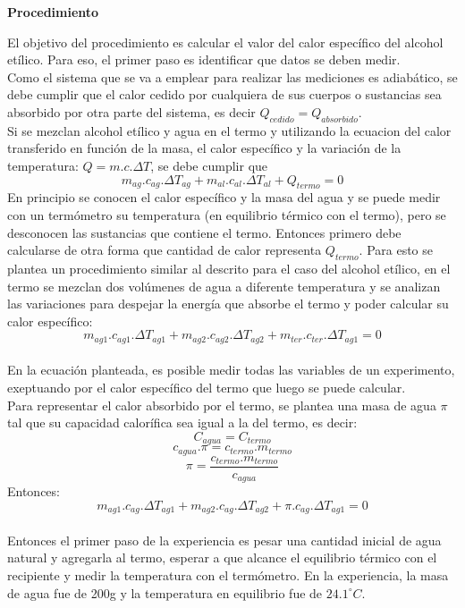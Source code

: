 \documentclass[11pt, letterpaper]{article}
\newcommand\celc{^\circ C}
\begin{document}
\pagebreak
\begin{center}\textbf{Procedimiento}\end{center}
El objetivo del procedimiento es calcular el valor del calor 
específico del alcohol etílico. Para eso, el primer paso es
identificar que datos se deben medir.\\
Como el sistema que se va a emplear para realizar las mediciones
es adiabático, se debe cumplir que el calor cedido por cualquiera
de sus cuerpos o sustancias sea absorbido por otra parte del 
sistema, es decir $Q_{cedido} = Q_{absorbido}$.\\
Si se mezclan alcohol etílico y agua en el termo y 
utilizando la ecuacion del calor transferido en función de la 
masa, el calor específico y la variación de la temperatura:
$Q = m.c.\Delta T$, se debe cumplir que 
$$m_{ag}.c_{ag}.\Delta T_{ag} + m_{al}.c_{al}.\Delta T_{al} + Q_{termo} = 0$$
En principio se conocen el calor específico y la masa del agua
y se puede medir con un termómetro su temperatura (en equilibrio
térmico con el termo), pero se desconocen las sustancias que 
contiene el termo. Entonces primero debe calcularse de otra
forma que cantidad de calor representa $Q_{termo}$.
Para esto se plantea un procedimiento similar al descrito para
el caso del alcohol etílico, en el termo se mezclan dos volúmenes
de agua a diferente temperatura y se analizan las variaciones
para despejar la energía que absorbe el termo y poder calcular
su calor específico:\\
$$m_{ag1}.c_{ag1}.\Delta T_{ag1} + m_{ag2}.c_{ag2}.\Delta T_{ag2} + m_{ter} 
.c_{ter}.\Delta T_{ag1} = 0$$\\
En la ecuación planteada, es posible medir todas las variables 
de un experimento, exeptuando por el calor específico del termo
que luego se puede calcular.\\
Para representar el calor absorbido por el termo, se plantea una masa de 
agua $\pi$ tal que su capacidad calorífica sea igual a la del termo, es decir:
$$ C_{agua} = C_{termo}$$
$$c_{agua}.\pi = c_{termo}.m_{termo}$$
$$\pi = \frac{c_{termo}.m_{termo}}{c_{agua}}$$
Entonces:
$$m_{ag1}.c_{ag}.\Delta T_{ag1} + m_{ag2}.c_{ag}.\Delta T_{ag2} + \pi 
.c_{ag}.\Delta T_{ag1} = 0$$\\
Entonces el primer paso de la experiencia es pesar una cantidad inicial
de agua natural y agregarla al termo, esperar a que alcance el equilibrio térmico
con el recipiente y medir la temperatura con el termómetro.
En la experiencia, la masa de agua fue de 200g y la temperatura en equilibrio
fue de $24.1 \celc$.\\
\end{document}
